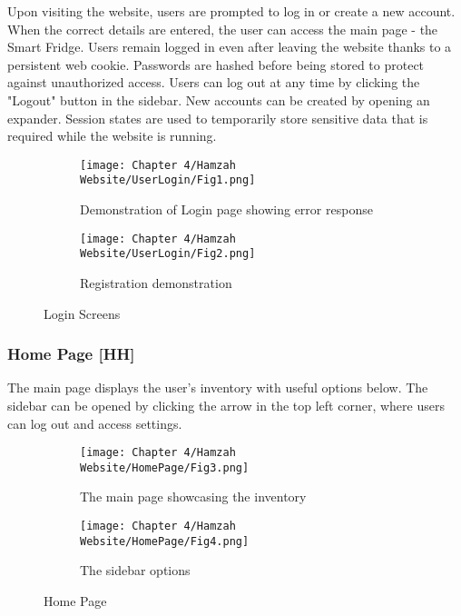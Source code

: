 Upon visiting the website, users are prompted to log in or create a new account.
When the correct details are entered, the user can access the main page - the Smart Fridge.
Users remain logged in even after leaving the website thanks to a persistent web cookie.
Passwords are hashed before being stored to protect against unauthorized access.
Users can log out at any time by clicking the "Logout" button in the sidebar.
New accounts can be created by opening an expander.
Session states are used to temporarily store sensitive data that is required while the website is running.


\begin{figure}[H]
    \begin{subfigure}{.5\textwidth}
        \centering
        \texttt{[image: Chapter 4/Hamzah Website/UserLogin/Fig1.png]}
        \caption{Demonstration of Login page showing error response}
    \end{subfigure}%
    \begin{subfigure}{.5\textwidth}
        \centering
        \texttt{[image: Chapter 4/Hamzah Website/UserLogin/Fig2.png]}
        \caption{Registration demonstration}
    \end{subfigure}
    \caption{Login Screens}
\end{figure}

\subsubsection{Home Page [HH]}

The main page displays the user's inventory with useful options below.
The sidebar can be opened by clicking the arrow in the top left corner, where users can log out and access settings.

\begin{figure}[H]
    \begin{subfigure}{.5\textwidth}
        \centering
        \texttt{[image: Chapter 4/Hamzah Website/HomePage/Fig3.png]}
        \caption{The main page showcasing the inventory}
    \end{subfigure}%
    \begin{subfigure}{.5\textwidth}
        \centering
        \texttt{[image: Chapter 4/Hamzah Website/HomePage/Fig4.png]}
        \caption{The sidebar options}
    \end{subfigure}
    \caption{Home Page}
\end{figure}

